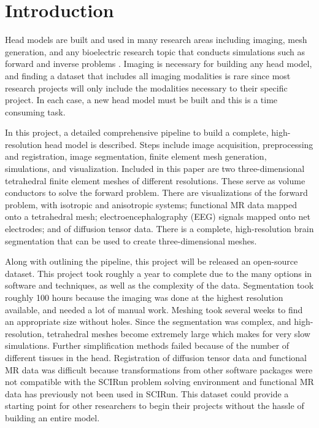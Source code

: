 
\section{Introduction}
\label{sec:intro}

Head models are built and used in many research areas including imaging, mesh generation, and any bioelectric research topic that conducts simulations such as forward and inverse problems \cite{ref:Brette2012}. Imaging is necessary for building any head model, and finding a dataset that includes all imaging modalities is rare since most research projects will only include the modalities necessary to their specific project. In each case, a new head model must be built and this is a time consuming task.

In this project, a detailed comprehensive pipeline to build a complete, high-resolution head model is described. Steps include image acquisition, preprocessing and registration, image segmentation, finite element mesh generation, simulations, and visualization. Included in this paper are two three-dimensional tetrahedral finite element meshes of different resolutions. These serve as volume conductors to solve the forward problem. There are visualizations of the forward problem, with isotropic and anisotropic systems; functional MR data mapped onto a tetrahedral mesh; electroencephalography (EEG) signals mapped onto net electrodes; and of diffusion tensor data. There is a complete, high-resolution brain segmentation that can be used to create three-dimensional meshes. 

Along with outlining the pipeline, this project will be released an open-source dataset. This project took roughly a year to complete due to the many options in software and techniques, as well as the complexity of the data. Segmentation took roughly 100 hours because the imaging was done at the highest resolution available, and needed a lot of manual work. Meshing took several weeks to find an appropriate size without holes. Since the segmentation was complex, and high-resolution, tetrahedral meshes become extremely large which makes for very slow simulations. Further simplification methods failed because of the number of different tissues in the head. Registration of diffusion tensor data and functional MR data was difficult because transformations from other software packages were not compatible with the SCIRun problem solving environment \cite{ref:scirun} and functional MR data has previously not been used in SCIRun. This dataset could provide a starting point for other researchers to begin their projects without the hassle of building an entire model. 